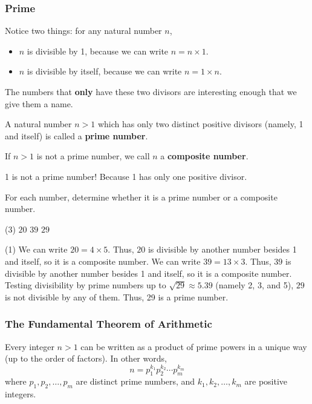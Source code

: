 \begin{frame}
\frametitle{Prime}
Notice two things: for any natural number $n$,
\begin{itemize}
\item $n$ is divisible by 1, because we can write $n = n \times 1$.
\item $n$ is divisible by itself, because we can write $n = 1 \times n$.
\end{itemize}
The numbers that \textbf{only} have these two divisors are interesting enough that we give them a name.
\begin{defn}{}{}
A natural number $n > 1$ which has only two distinct positive divisors (namely, 1 and itself) is called a \textbf{prime number}.

\medskip
If $n > 1$ is not a prime number, we call $n$ a \textbf{composite number}.
\end{defn}

\begin{remark}{}
1 is not a prime number! Because 1 has only one positive divisor.
\end{remark}
\end{frame}


\begin{frame}[t]
\begin{ex}
For each number, determine whether it is a prime number or a composite number.
\begin{tasks}(3)
\task $20$
\task $39$
\task $29$
\end{tasks}
\end{ex}
\begin{sol}
\begin{tasks}(1)
\task We can write $20 = 4 \times 5$. Thus, $20$ is divisible by another number besides 1 and itself, so it is a composite number.
\task We can write $39 = 13 \times 3$. Thus, $39$ is divisible by another number besides 1 and itself, so it is a composite number.
\task Testing divisibility by prime numbers up to $\sqrt{29} \approx 5.39$ (namely 2, 3, and 5), $29$ is not divisible by any of them. Thus, 29 is a prime number.
\end{tasks}
\end{sol}
\end{frame}


\begin{frame}
\frametitle{The Fundamental Theorem of Arithmetic}
\begin{thm}{}{}
Every integer $n > 1$ can be written as a product of prime powers in a unique way (up to the order of factors). In other words,
\[n = p_1^{k_1} p_2 ^{k_2} \cdots p_m^{k_m}\]
where $p_1, p_2, \ldots, p_m$ are distinct prime numbers, and $k_1, k_2, \ldots, k_m$ are positive integers.
\end{thm}

\end{frame}



